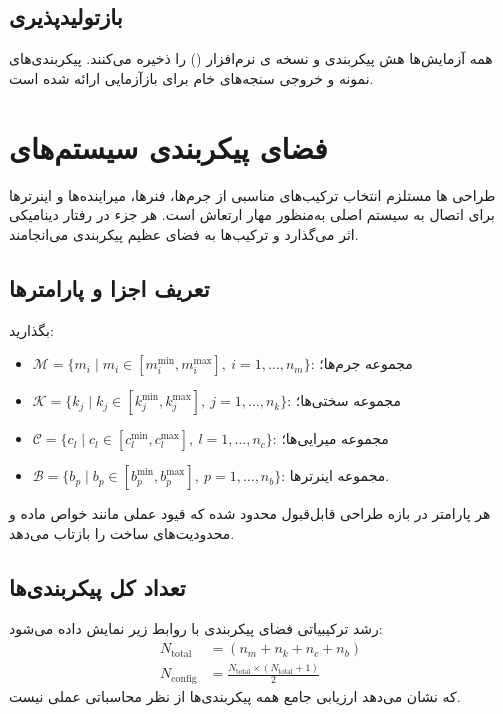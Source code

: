\subsection{بازتولیدپذیری}
همه آزمایش‌ها هش پیکربندی و نسخه ی نرم‌افزار (\softwareVersion{}) را ذخیره می‌کنند. پیکربندی‌های نمونه و خروجی سنجه‌های خام برای بازآزمایی ارائه شده است.

\section{فضای پیکربندی سیستم‌های }

طراحی ‌ها مستلزم انتخاب ترکیب‌های مناسبی از جرم‌ها، فنرها، میراینده‌ها و اینرترها برای اتصال به سیستم اصلی به‌منظور مهار ارتعاش است. هر جزء در رفتار دینامیکی اثر می‌گذارد و ترکیب‌ها به فضای عظیم پیکربندی می‌انجامند.

\subsection{تعریف اجزا و پارامترها}

بگذارید:
\begin{itemize}
    \item $\mathcal{M}=\{ m_i\mid m_i\in[m_i^{\min},m_i^{\max}],\ i=1,\ldots,n_m\}$: مجموعه جرم‌ها؛
    \item $\mathcal{K}=\{ k_j\mid k_j\in[k_j^{\min},k_j^{\max}],\ j=1,\ldots,n_k\}$: مجموعه سختی‌ها؛
    \item $\mathcal{C}=\{ c_l\mid c_l\in[c_l^{\min},c_l^{\max}],\ l=1,\ldots,n_c\}$: مجموعه میرایی‌ها؛
    \item $\mathcal{B}=\{ b_p\mid b_p\in[b_p^{\min},b_p^{\max}],\ p=1,\ldots,n_b\}$: مجموعه اینرترها.
\end{itemize}

هر پارامتر در بازه طراحی قابل‌قبول محدود شده که قیود عملی مانند خواص ماده و محدودیت‌های ساخت را بازتاب می‌دهد.

\subsection{تعداد کل پیکربندی‌ها}
رشد ترکیبیاتی فضای پیکربندی با روابط زیر نمایش داده می‌شود:
\begin{align}
N_{\text{total}} &= \left( n_m + n_k + n_c + n_b \right)\\
N_{\text{config}} &= \frac{N_{\text{total}} \times (N_{\text{total}} + 1)}{2}
\label{eq:N_config}
\end{align}
که نشان می‌دهد ارزیابی جامع همه پیکربندی‌ها از نظر محاسباتی عملی نیست.

